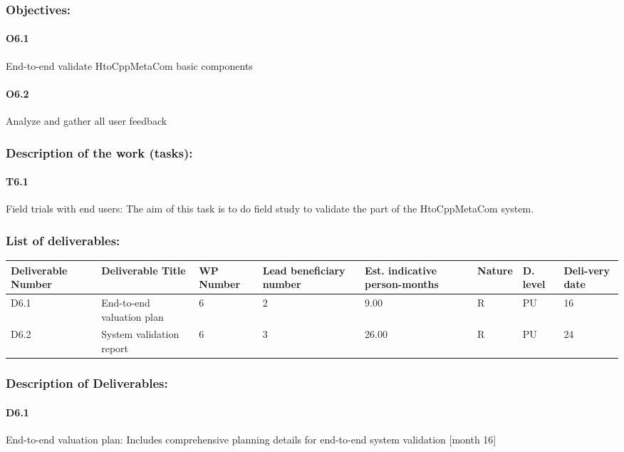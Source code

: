 \documentclass{article}
\begin{document}
\subsubsection{Objectives:}
\paragraph{O6.1} End-to-end validate HtoCppMetaCom basic components
\paragraph{O6.2} Analyze and gather all user feedback
\subsubsection{Description of the work (tasks):}
\paragraph{T6.1} Field trials with end users: The aim of this task is to do field study to validate the part of the HtoCppMetaCom system. 


\subsubsection{List of deliverables:}
\begin{center}
	\begin{tabular}{ |p{1.6cm}|p{2cm}|p{0.8cm}|p{0.8cm}|p{0.9cm}|p{1cm}|p{0.5cm}|p{0.8cm}| }
		\hline
		Deliverable Number & Deliverable Title & WP Number & Lead beneficiary number & Est. indicative person-months & Nature & D. level & Deli-very date \\ \hline
		D6.1 & End-to-end valuation plan
 & 6 & 2 & 9.00 & R & PU & 16 \\ \hline
		D6.2 & System validation report & 6 & 3 & 26.00 & R & PU & 24 \\ \hline
	\end{tabular}
\end{center}

\subsubsection{Description of Deliverables:}
\paragraph{D6.1} End-to-end valuation plan: Includes comprehensive planning details for end-to-end system validation [month 16]
\end{document}
